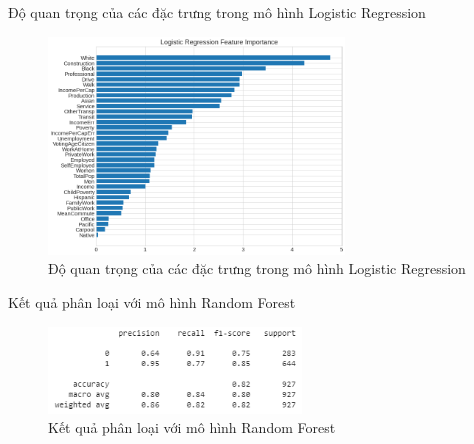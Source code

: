 \documentclass[10pt]{beamer}
\theoremstyle{remark}
\theoremstyle{definition}
\begin{document}
\begin{frame}{Độ quan trọng của các đặc trưng trong mô hình Logistic Regression}
	\begin{figure}[h!]
        \centering
        \includegraphics[width=0.7\textwidth]{figures/Logistic_Regression_Feature_Importance.png}
        \caption{Độ quan trọng của các đặc trưng trong mô hình Logistic Regression}
    \end{figure}
\end{frame}

\begin{frame}{Kết quả phân loại với mô hình Random Forest}
	\begin{figure}[h!]
        \centering
        \includegraphics[width=0.6\textwidth]{figures/Random_Forest_Feature_Report.png}
        \caption{Kết quả phân loại với mô hình Random Forest}
    \end{figure}
\end{frame}
\end{document}
